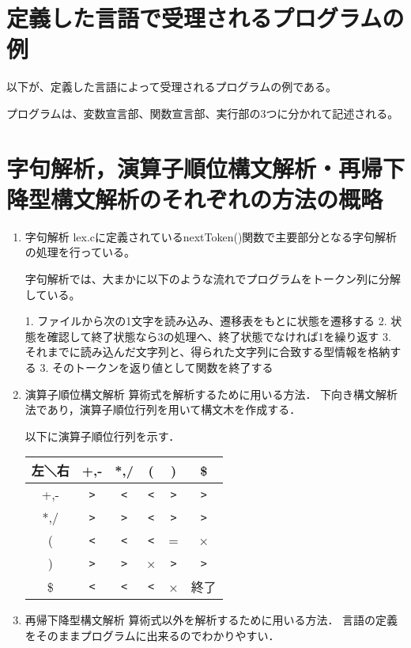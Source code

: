 \documentclass[11pt,a4j]{jarticle}
\begin{document}

\section{定義した言語で受理されるプログラムの例}


以下が、定義した言語によって受理されるプログラムの例である。




プログラムは、変数宣言部、関数宣言部、実行部の3つに分かれて記述される。

\newpage




\section{字句解析，演算子順位構文解析・再帰下降型構文解析のそれぞれの方法の概略}

\begin{enumerate}
\item{字句解析}
lex.cに定義されているnextToken()関数で主要部分となる字句解析の処理を行っている。

字句解析では、大まかに以下のような流れでプログラムをトークン列に分解している。

1. ファイルから次の1文字を読み込み、遷移表をもとに状態を遷移する
2. 状態を確認して終了状態なら3の処理へ、終了状態でなければ1を繰り返す
3. それまでに読み込んだ文字列と、得られた文字列に合致する型情報を格納する
3. そのトークンを返り値として関数を終了する



\item{演算子順位構文解析}
算術式を解析するために用いる方法．
下向き構文解析法であり，演算子順位行列を用いて構文木を作成する．

以下に演算子順位行列を示す．
\begin{table}[h]
\centering
\begin{tabular}{|c|c|c|c|c|c|}\hline
左＼右 & +,- & *,/ & ( & ) & \$\\ \hline
+,- & \verb|>| & \verb|<| & \verb|<| & \verb|>| & \verb|>| \\ \hline
*,/ & \verb|>| & \verb|>| & \verb|<| & \verb|>| & \verb|>| \\ \hline
( & \verb|<| & \verb|<| & \verb|<| & = & × \\ \hline
) & \verb|>| & \verb|>| & × & \verb|>| & \verb|>| \\ \hline
\$ & \verb|<| & \verb|<| & \verb|<| & × & 終了 \\ \hline
\end{tabular}
\end{table}


\item{再帰下降型構文解析}
算術式以外を解析するために用いる方法．
言語の定義をそのままプログラムに出来るのでわかりやすい．

\end{enumerate}
\end{document}
